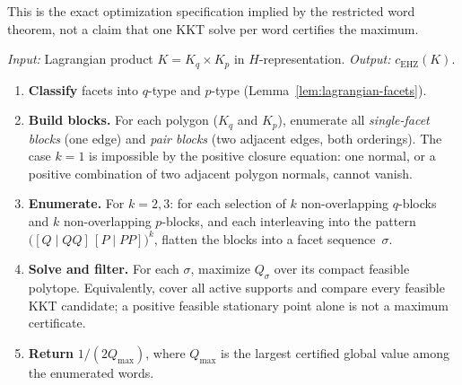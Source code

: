 \begin{unverified}
\begin{algorithm}\label{alg:billiard}
This is the exact optimization specification implied by the restricted word
theorem, not a claim that one KKT solve per word certifies the maximum.

\emph{Input:} Lagrangian product $K = K_q \times K_p$ in
$H$-representation.
\quad
\emph{Output:} $c_{\mathrm{EHZ}}(K)$.

\begin{enumerate}
\item \textbf{Classify} facets into $q$-type and $p$-type
  (Lemma~\ref{lem:lagrangian-facets}).
\item \textbf{Build blocks.}
  For each polygon ($K_q$ and $K_p$), enumerate all
  \emph{single-facet blocks} (one edge) and
  \emph{pair blocks} (two adjacent edges, both orderings).
  The case $k=1$ is impossible by the positive closure equation: one normal,
  or a positive combination of two adjacent polygon normals, cannot vanish.
\item \textbf{Enumerate.}
  For $k = 2, 3$: for each selection of $k$ non-overlapping
  $q$-blocks and $k$ non-overlapping $p$-blocks, and each
  interleaving into the pattern
  $\bigl([Q \mid QQ]\,[P \mid PP]\bigr)^k$,
  flatten the blocks into a facet sequence~$\sigma$.
\item \textbf{Solve and filter.}
  For each $\sigma$, maximize $Q_\sigma$ over its compact feasible polytope.
  Equivalently, cover all active supports and compare every feasible KKT
  candidate; a positive feasible stationary point alone is not a maximum
  certificate.
\item \textbf{Return} $1/(2Q_{\max})$, where $Q_{\max}$ is the largest
  certified global value among the enumerated words.
\end{enumerate}
\end{algorithm}
\end{unverified}
